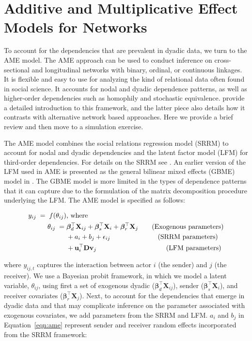 \section{\textbf{Additive and Multiplicative Effect Models for Networks}}

To account for the dependencies that are prevalent in dyadic data, we turn to the AME model. The AME approach can be used to conduct inference on cross-sectional and longitudinal networks with binary, ordinal, or continuous linkages. It is flexible and easy to use for analyzing the kind of relational data often found in social science. It accounts for nodal and dyadic dependence patterns, as well as higher-order dependencies such as homophily and stochastic equivalence. \citet{hoff:2015:arxiv,minhas:etal:2016:arxiv} provide a detailed introduction to this framework, and the latter piece also details how it contrasts with alternative network based approaches. Here we provide a brief review and then move to a simulation exercise.

The AME model combines the social relations regression model (SRRM) to account for nodal and dyadic dependencies and the latent factor model (LFM) for third-order dependencies.  For details on the SRRM see \citet{li:loken:2002,dorff:minhas:2017}. An earlier version of the LFM  used in AME is presented as the general bilinear mixed effects (GBME) model in \citet{hoff:ward:2004}. The GBME model is more limited in the types of dependence patterns that it can capture due to the formulation of the matrix decomposition procedure underlying the LFM. The AME model is specified as follows:

\begin{align}
	\begin{aligned}
		y_{ij} \;=\; f(\theta_{ij}) &\text{, where } \\
		\theta_{ij} \;=\;& \bm\beta_{d}^{\top} \mathbf{X}_{ij} + \bm\beta_{s}^{\top} \mathbf{X}_{i} + \bm\beta_{r}^{\top} \mathbf{X}_{j} \text{\qquad(Exogenous parameters)} \\
		& + a_{i} + b_{j} + \epsilon_{ij} \text{\qquad\qquad\qquad\quad(SRRM parameters)} \\
		& + \mathbf{u}_{i}^{\top} \mathbf{D} \mathbf{v}_{j}  \text{\qquad\qquad\qquad\qquad\qquad\;(LFM parameters)} \\ 
	\label{eqn:ame}
	\end{aligned}
\end{align}

where $y_{ij,t}$ captures the interaction between actor $i$ (the sender) and $j$ (the receiver). We use a Bayesian probit framework, in which we model a latent variable, $\theta_{ij}$, using first a set of exogenous dyadic ($\bm\beta_{d}^{\top} \mathbf{X}_{ij}$), sender ($\bm\beta_{s}^{\top} \mathbf{X}_{i}$), and receiver covariates ($\bm\beta_{r}^{\top} \mathbf{X}_{j}$). Next, to account for the dependencies that emerge in dyadic data and that may complicate inference on the parameter associated with exogenous covariates, we add parameters from the SRRM and LFM. $a_{i}$ and $b_{j}$ in Equation~\ref{eqn:ame} represent sender and receiver random effects incorporated from the SRRM framework:

